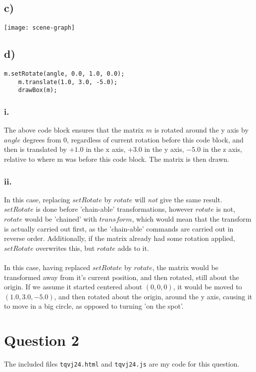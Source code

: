 \documentclass[a4paper,12pt]{article}
\begin{document}
\subsection*{c)}
\texttt{[image: scene-graph]}
\newpage
\subsection*{d)}
\begin{lstlisting}[title=Explaining the meaning]
    m.setRotate(angle, 0.0, 1.0, 0.0);
    m.translate(1.0, 3.0, -5.0);
    drawBox(m);
\end{lstlisting}
\subsubsection*{i.}

The above code block ensures that the matrix $m$ is rotated around the y axis by $angle$ degrees from $0$, regardless of current rotation before this code block, and then is translated by $+1.0$ in the x axis, $+3.0$ in the y axis, $-5.0$ in the z axis, relative to where m was before this code block. The matrix is then drawn.
\subsubsection*{ii.}
In this case, replacing $setRotate$ by $rotate$ will \textit{not} give the same result. $setRotate$ is done before 'chain-able' transformations, however $rotate$ is not, $rotate$ would be 'chained' with $transform$, which would mean that the transform is actually carried out first, as the 'chain-able' commands are carried out in reverse order. Additionally, if the matrix already had some rotation applied, $setRotate$ overwrites this, but $rotate$ adds to it.\\\\In this case, having replaced $setRotate$ by $rotate$, the matrix would be transformed away from it's current position, and then rotated, still about the origin. If we assume it started centered about $(0,0,0)$, it would be moved to $(1.0, 3.0, -5.0)$, and then rotated about the origin, around the y axis, causing it to move in a big circle, as opposed to turning 'on the spot'.

\section*{Question 2}
The included files \texttt{tqvj24.html} and \texttt{tqvj24.js} are my code for this question.
\end{document}
